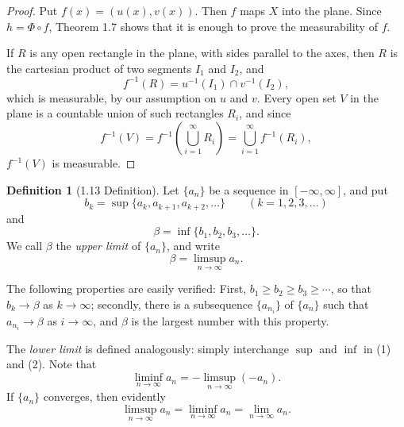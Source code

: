 \documentclass[12pt]{article}
\theoremstyle{definition} %
\newtheorem{definition}{Definition}
\theoremstyle{plain} %
\begin{document}
    \begin{proof}
    Put $f(x) = (u(x), v(x))$. Then $f$ maps $X$ into the plane. Since $h = \Phi \circ f$, Theorem 1.7 shows that it is enough to prove the measurability of $f$.
    
    If $R$ is any open rectangle in the plane, with sides parallel to the axes, then $R$ is the cartesian product of two segments $I_1$ and $I_2$, and
    \[
    f^{-1}(R) = u^{-1}(I_1) \cap v^{-1}(I_2),
    \]
    which is measurable, by our assumption on $u$ and $v$. Every open set $V$ in the plane is a countable union of such rectangles $R_i$, and since
    \[
    f^{-1}(V) = f^{-1} \left( \bigcup_{i=1}^{\infty} R_i \right) = \bigcup_{i=1}^{\infty} f^{-1}(R_i),
    \]
    $f^{-1}(V)$ is measurable.
    \end{proof}
    \begin{definition}[1.13 Definition]
      Let $\{a_n\}$ be a sequence in $[-\infty, \infty]$, and put
      \begin{equation}
          b_k = \sup \{a_k, a_{k+1}, a_{k+2}, \ldots\} \qquad (k = 1, 2, 3, \ldots)
      \end{equation}
      and
      \begin{equation}
          \beta = \inf \{b_1, b_2, b_3, \ldots\}.
      \end{equation}
      We call $\beta$ the \textit{upper limit} of $\{a_n\}$, and write
      \begin{equation}
          \beta = \limsup_{n \to \infty} a_n.
      \end{equation}
      
      The following properties are easily verified: First, $b_1 \ge b_2 \ge b_3 \ge \cdots$, so that $b_k \to \beta$ as $k \to \infty$; secondly, there is a subsequence $\{a_{n_i}\}$ of $\{a_n\}$ such that $a_{n_i} \to \beta$ as $i \to \infty$, and $\beta$ is the largest number with this property.
      
      The \textit{lower limit} is defined analogously: simply interchange $\sup$ and $\inf$ in (1) and (2). Note that
      \begin{equation}
          \liminf_{n \to \infty} a_n = - \limsup_{n \to \infty} (-a_n).
      \end{equation}
      If $\{a_n\}$ converges, then evidently
      \begin{equation}
          \limsup_{n \to \infty} a_n = \liminf_{n \to \infty} a_n = \lim_{n \to \infty} a_n.
      \end{equation}
      

\end{definition}
\end{document}
